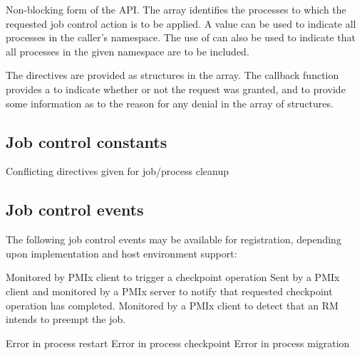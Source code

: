 \optattrend

\descr

Non-blocking form of the  \ac{API}.
The  array identifies the processes to which the requested job control action is to be applied.
A  value can be used to indicate all processes in the caller's namespace.
The use of  can also be used to indicate that all processes in the given namespace are to be included.

The directives are provided as  structures in the  array.
The callback function provides a  to indicate whether or not the request was granted, and to provide some information as to the reason for any denial in the  array of  structures.

\subsection{Job control constants}
\label{api:struct:constants:jobcontrol}

\begin{constantdesc}

%
Conflicting directives given for job/process cleanup

\end{constantdesc}

\subsection{Job control events}
\label{api:struct:events:jobcontrol}

The following job control events may be available for registration, depending upon implementation and host environment support:

\begin{constantdesc}

%
Monitored by \ac{PMIx} client to trigger a checkpoint operation
%
Sent by a \ac{PMIx} client and monitored by a \ac{PMIx} server to notify that requested checkpoint operation has completed.
%
Monitored by a \ac{PMIx} client to detect that an \ac{RM} intends to preempt the job.

%
Error in process restart
%
Error in process checkpoint
%
Error in process migration

\end{constantdesc}

